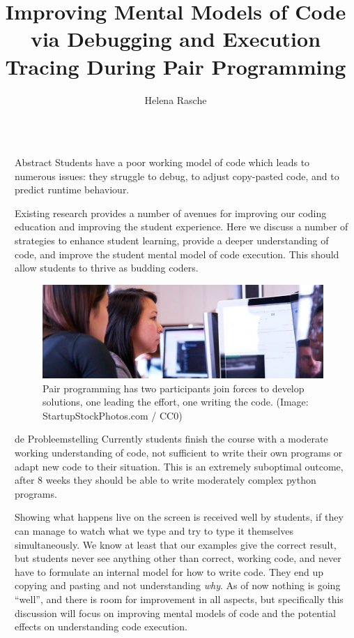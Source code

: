 \documentclass[final]{beamer}
\title{Improving Mental Models of Code via Debugging and Execution Tracing During Pair Programming}
\author{Helena Rasche}
\institute[ATGM]{Avans ATGM}
\newlength{\sepwidth}
\newlength{\colwidth}
\newcommand{\separatorcolumn}{\begin{column}{\sepwidth}\end{column}}
\begin{document}
\begin{frame}[t,fragile]
\begin{columns}[t]
\separatorcolumn

\begin{column}{\colwidth}

  \begin{block}{Abstract}
    \large Students have a poor working model of code which leads to numerous issues:
    they struggle to debug, to adjust copy-pasted code, and to predict runtime
    behaviour.

    Existing research provides a number of avenues for improving our coding education and improving the student experience. Here we discuss a number of strategies to enhance student learning, provide a deeper understanding of code, and improve the student mental model of code execution. This should allow students to thrive as budding coders.

    \begin{figure}[ht]
        \centering
        \includegraphics[width=\textwidth]{pair-programming.jpg}
        \caption{Pair programming has two participants join forces to develop solutions, one leading the effort, one writing the code. (Image: StartupStockPhotos.com / CC0)}
        \label{fig:pair}
    \end{figure}
  \end{block}

  \begin{block}{de Probleemstelling}
    Currently students finish the course with a moderate working understanding of
    code, not sufficient to write their own programs or adapt new code to their
    situation. This is an extremely suboptimal outcome, after 8 weeks they
    should be able to write moderately complex python programs.

    Showing what happens live on the screen is received well by students, if
    they can manage to watch what we type and try to type it themselves
    simultaneously. We know at least that our examples give the correct result,
    but students never see anything other than correct, working code, and never
    have to formulate an internal model for how to write code. They end up
    copying and pasting and not understanding \emph{why}. As of now nothing is going
    ``well'', and there is room for improvement in all aspects, but specifically
    this discussion will focus on improving mental models of code and the
    potential effects on understanding code execution.


\end{block}
\end{column}
\end{columns}
\end{frame}
\end{document}
